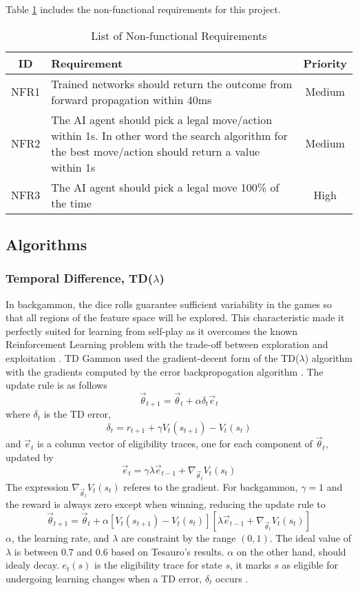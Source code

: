 \documentclass[12pt,a4paper]{article}
\begin{document}
Table \ref{nonreq} includes the non-functional requirements for this project.
\begin{table}[htb]
    \centering
    \caption{List of Non-functional Requirements}
    \vspace*{6pt}
    \label{nonreq}
    \begin{tabular}{cp{12cm}c}
        \hline
        \hline
        ID & Requirement & Priority \\ 
        \hline
        NFR1 & Trained networks should return the outcome from forward propagation within 40ms & Medium \\
        \hline
        NFR2 & The AI agent should pick a legal move/action within 1s. In other word the search algorithm for the best move/action should return a value within 1s & Medium \\
        \hline
        NFR3 & The AI agent should pick a legal move 100\% of the time & High \\
        \hline
    \end{tabular}
\end{table}
\subsection{Algorithms}
\subsubsection{Temporal Difference, TD($\lambda$)}
In backgammon, the dice rolls guarantee sufficient variability in the games so that all regions of the feature space will be explored. This characteristic made it perfectly suited for learning from self-play as it overcomes the known Reinforcement Learning problem with the trade-off between exploration and exploitation \cite{survey}. TD Gammon used the gradient-decent form of the TD($\lambda$) algorithm with the gradients computed by the error backpropogation algorithm \cite{rl}. The update rule is as follows
$$\vec{\theta}_{t+1} = \vec{\theta}_{t} + \alpha\delta_t\vec{e}_{t}$$ 
where $\delta_t$ is the TD error,
$$\delta_{t} = r_{t+1} + \gamma V_t(s_{t+1}) - V_t(s_t)$$ 
and $\vec{e}_t$ is a column vector of eligibility traces, one for each component of $\vec{\theta}_t$, updated by 
$$\vec{e}_{t} = \gamma\lambda\vec{e}_{t-1} + \nabla_{\vec{\theta}_{t}}V_t(s_t)$$ 
The expression $\nabla_{\vec{\theta}_{t}}V_t(s_t)$ referes to the gradient. For backgammon, $\gamma=1$ and the reward is always zero except when winning, reducing the update rule to
$$\vec{\theta}_{t+1} = \vec{\theta}_{t} + \alpha[V_t(s_{t+1}) - V_t(s_t)][\lambda\vec{e}_{t-1} + \nabla_{\vec{\theta}_{t}}V_t(s_t)]$$
$\alpha$, the learning rate, and $\lambda$ are constraint by the range $(0,1)$. The ideal value of $\lambda$ is between $0.7$ and $0.6$ based on Tesauro's \citeyear{DBLP:journals/ai/Tesauro02} results. $\alpha$ on the other hand, should idealy decay. $e_t(s)$ is the eligibility trace for state $s$, it marks $s$ as eligible for undergoing learning changes when a TD error, $\delta_t$ occurs \cite{rl}.
\end{document}
